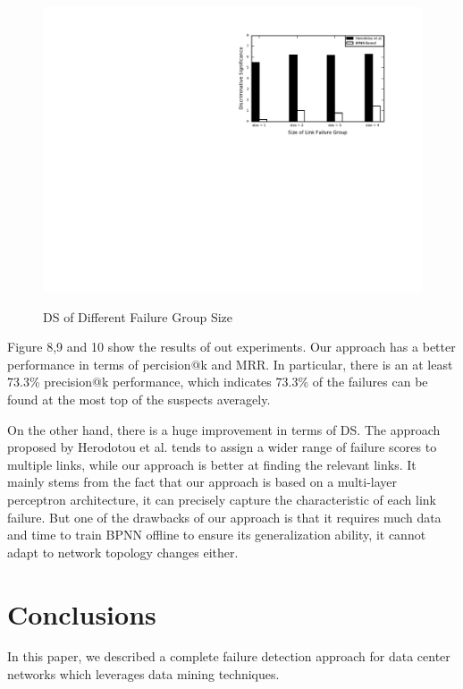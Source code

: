 \documentclass{sig-alternate-05-2015}
\begin{document}
\begin{figure}
  \centering
  \includegraphics[scale=0.7]{ds} \\
  \caption{DS of Different Failure Group Size}
\end{figure}

Figure 8,9 and 10 show the results of out experiments. Our approach has a better performance in terms of percision@k and MRR. In particular, there is an at least 73.3\% precision@k performance, which indicates 73.3\% of the failures can be found at the most top of the suspects averagely.

On the other hand, there is a huge improvement in terms of DS. The approach proposed by Herodotou et al. tends to assign a wider range of failure scores to multiple links, while our approach is better at finding the relevant links. It mainly stems from the fact that our approach is based on a multi-layer perceptron architecture, it can precisely capture the characteristic of each link failure. But one of the drawbacks of our approach is that it requires much data and time to train BPNN offline to ensure its generalization ability, it cannot adapt to network topology changes either.





\section{Conclusions}
In this paper, we described a complete failure detection approach for data center networks which leverages data mining techniques. 
\end{document}
